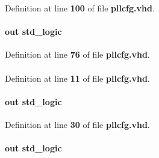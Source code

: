 Definition at line {\bf 100} of file {\bf pllcfg.\+vhd}.

\paragraph[{n\+\_\+odddiv}]{ {\bfseries \textcolor{keywordflow}{out}\textcolor{vhdlchar}{ }} {\bfseries \textcolor{comment}{std\+\_\+logic}\textcolor{vhdlchar}{ }} \hspace{0.3cm}{\ttfamily [Port]}}\label{classpllcfg_a3ba2c9a0140c3b709047d00b9cd01efd}


Definition at line {\bf 76} of file {\bf pllcfg.\+vhd}.

\paragraph[{numeric\+\_\+std}]{\hspace{0.3cm}{\ttfamily [Package]}}\label{classpllcfg_a2edc34402b573437d5f25fa90ba4013e}


Definition at line {\bf 11} of file {\bf pllcfg.\+vhd}.

\paragraph[{oenA}]{ {\bfseries \textcolor{keywordflow}{out}\textcolor{vhdlchar}{ }} {\bfseries \textcolor{comment}{std\+\_\+logic}\textcolor{vhdlchar}{ }} \hspace{0.3cm}{\ttfamily [Port]}}\label{classpllcfg_afa0766a50ad9e7f2dbaf411d49248d42}


Definition at line {\bf 30} of file {\bf pllcfg.\+vhd}.

\paragraph[{oenB}]{ {\bfseries \textcolor{keywordflow}{out}\textcolor{vhdlchar}{ }} {\bfseries \textcolor{comment}{std\+\_\+logic}\textcolor{vhdlchar}{ }} \hspace{0.3cm}{\ttfamily [Port]}}\label{classpllcfg_aedc84dbd34bf048e192b116fc66d039a}


